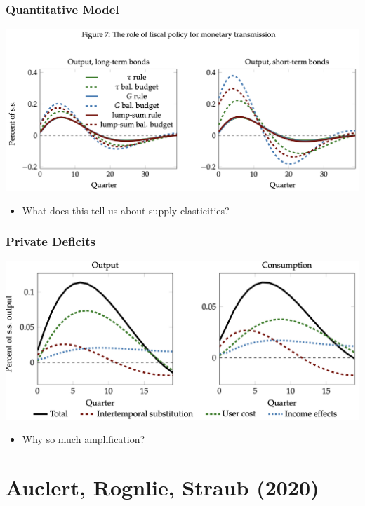 \documentclass[english,xcolor=svgnames]{beamer}
\begin{document}


\begin{frame}
    \frametitle{Quantitative Model}
    \includegraphics[scale=0.5]{figures/ARSFIG7.png}
    \begin{itemize}
    	\item What does this tell us about supply elasticities?
    \end{itemize}
\end{frame}

\begin{frame}
    \frametitle{Private Deficits}
    \includegraphics[scale=0.5]{figures/ARSFIG8.png}
    \begin{itemize}
    	\item Why so much amplification?
    \end{itemize}
\end{frame}


\section{Auclert, Rognlie, Straub (2020)}
\end{document}
